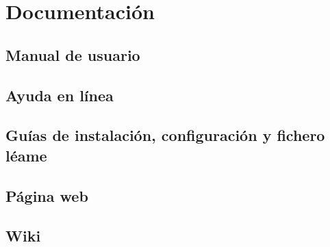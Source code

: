 \chapter{Documentación}

\section{Manual de usuario}

\section{Ayuda en línea}

\section{Guías de instalación, configuración y fichero léame}

\section{Página web}

\section{Wiki}
